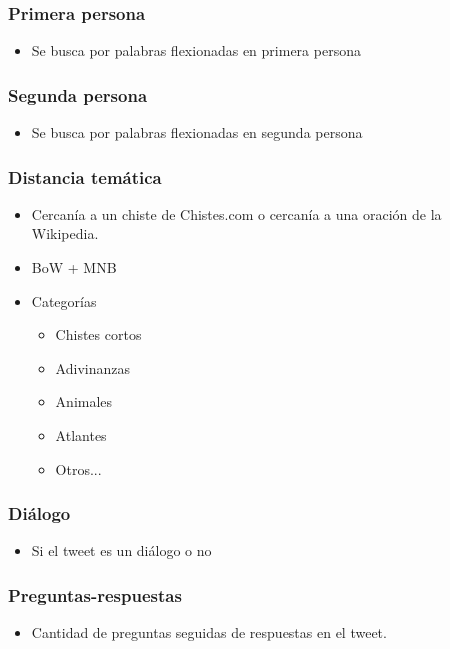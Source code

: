\begin{frame}
    \frametitle{Primera persona}

    \begin{itemize}
        \item Se busca por palabras flexionadas en primera persona
    \end{itemize}
\end{frame}

\begin{frame}
    \frametitle{Segunda persona}

    \begin{itemize}
        \item Se busca por palabras flexionadas en segunda persona
    \end{itemize}
\end{frame}

\begin{frame}
    \frametitle{Distancia temática}

    \begin{itemize}[<+->]
        \item Cercanía a un chiste de Chistes.com o cercanía a una oración de la Wikipedia.
        \item BoW + MNB
        \item Categorías
        \begin{itemize}[<+->]
            \item Chistes cortos
            \item Adivinanzas
            \item Animales
            \item Atlantes
            \item Otros...
        \end{itemize}
    \end{itemize}
\end{frame}

\begin{frame}
    \frametitle{Diálogo}

    \begin{itemize}
        \item Si el tweet es un diálogo o no
    \end{itemize}
\end{frame}

\begin{frame}
    \frametitle{Preguntas-respuestas}

    \begin{itemize}
        \item Cantidad de preguntas seguidas de respuestas en el tweet.
    \end{itemize}
\end{frame}

